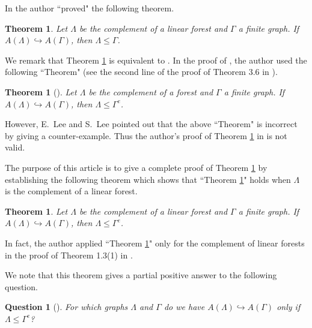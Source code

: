\documentclass{amsart}
\theoremstyle{definition}
\theoremstyle{plain}
\newtheorem{theorem}[definition]{Theorem}
\newtheorem{question}[definition]{Question}
\numberwithin{equation}{section}
\begin{document}
In \cite{Katayama17} the author ``proved" the following theorem. 

\begin{theorem}
Let $\Lambda$ be the complement of a linear forest and $\Gamma$ a finite graph. 
If $A(\Lambda) \hookrightarrow A(\Gamma)$, then $\Lambda \leq \Gamma$. 
\label{Main-theorem} 
\end{theorem}

We remark that Theorem \ref{Main-theorem} is equivalent to \cite[Theorem 1.3(1)]{Katayama17}. 
In the proof of \cite[Theorem 1.3(1)]{Katayama17}, the author used the following ``Theorem" (see the second line of the proof of Theorem 3.6 in \cite{Katayama17}). 

\begin{theorem}[{\cite[Theorem 3.14]{Casals-Ruiz15}}]
Let $\Lambda$ be the complement of a forest and $\Gamma$ a finite graph. 
If $A(\Lambda) \hookrightarrow A(\Gamma)$, then $\Lambda \leq \Gamma^e$. 
\label{Casals-Ruiz_lemma}
\end{theorem}

However, E.~Lee and S.~Lee \cite{Lee--Lee17} pointed out that the above ``Theorem" is incorrect by giving a counter-example. 
Thus the author's proof of Theorem \ref{Main-theorem} in \cite{Katayama17} is not valid. 

The purpose of this article is to give a complete proof of Theorem \ref{Main-theorem} by establishing the following theorem which shows that ``Theorem \ref{Casals-Ruiz_lemma}" holds when $\Lambda$ is the complement of a linear forest. 

\begin{theorem}
Let $\Lambda$ be the complement of a linear forest and $\Gamma$ a finite graph. 
If $A(\Lambda) \hookrightarrow A(\Gamma)$, then $\Lambda \leq \Gamma^e$. 
\label{linear-forest_lemma}
\end{theorem}

In fact, the author applied ``Theorem \ref{Casals-Ruiz_lemma}" only for the complement of linear forests in the proof of 
Theorem 1.3(1) in \cite{Katayama17}. 

We note that this theorem gives a partial positive answer to the following question. 

\begin{question}[{\cite[Question 1.5]{Kim--Koberda13}}]
For which graphs $\Lambda$ and $\Gamma$ do we have $A(\Lambda) \hookrightarrow A(\Gamma)$ only if $\Lambda \leq \Gamma^e$? 
\end{question}
\end{document}
